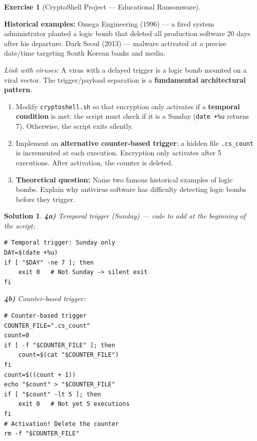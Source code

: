 \documentclass[a4paper,11pt]{article}
\theoremstyle{plain}
\newtheorem{correction}{Solution}
\theoremstyle{definition}
\newtheorem{exercice}{Exercise}
\begin{document}
\begin{exercice}[CryptoShell Project --- Educational Ransomware]
\begin{rappel}
\medskip
\textbf{Historical examples:} Omega Engineering (1996) --- a fired system administrator planted a logic bomb that deleted all production software 20 days after his departure. Dark Seoul (2013) --- malware activated at a precise date/time targeting South Korean banks and media.

\medskip
\textit{Link with viruses:} A virus with a delayed trigger is a logic bomb mounted on a viral vector. The trigger/payload separation is a \textbf{fundamental architectural pattern}.
\end{rappel}

\begin{enumerate}
\item[\textbf{4a)}] Modify \texttt{cryptoshell.sh} so that encryption only activates if a \textbf{temporal condition} is met: the script must check if it is a Sunday (\texttt{date +\%u} returns 7). Otherwise, the script exits silently.

\item[\textbf{4b)}] Implement an \textbf{alternative counter-based trigger}: a hidden file \texttt{.cs\_count} is incremented at each execution. Encryption only activates after 5 executions. After activation, the counter is deleted.

\item[\textbf{4c)}] \textbf{Theoretical question:} Name two famous historical examples of logic bombs. Explain why antivirus software has difficulty detecting logic bombs before they trigger.
\end{enumerate}

\begin{correction}

\textbf{4a)} Temporal trigger (Sunday) --- code to add at the beginning of the script:
\begin{lstlisting}[title=Temporal trigger]
# Temporal trigger: Sunday only
DAY=$(date +%u)
if [ "$DAY" -ne 7 ]; then
    exit 0   # Not Sunday -> silent exit
fi
\end{lstlisting}

\textbf{4b)} Counter-based trigger:
\begin{lstlisting}[title=Counter-based trigger]
# Counter-based trigger
COUNTER_FILE=".cs_count"
count=0
if [ -f "$COUNTER_FILE" ]; then
    count=$(cat "$COUNTER_FILE")
fi
count=$((count + 1))
echo "$count" > "$COUNTER_FILE"
if [ "$count" -lt 5 ]; then
    exit 0   # Not yet 5 executions
fi
# Activation! Delete the counter
rm -f "$COUNTER_FILE"
\end{lstlisting}


\end{correction}
\end{exercice}
\end{document}
